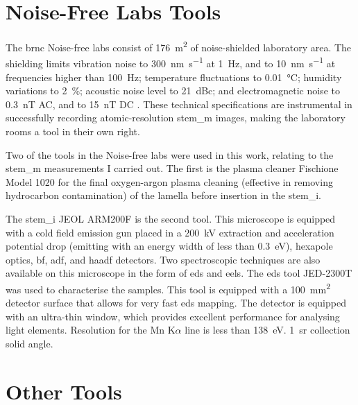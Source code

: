 \section{Noise-Free Labs Tools}

The \acs{brnc} Noise-free labs consist of \qty{176}{\m^2} of noise-shielded laboratory area. The shielding limits vibration noise to \qty{300}{\nm\per\s} at \qty{1}{Hz}, and to \qty{10}{\nm\per\s} at frequencies higher than \qty{100}{Hz}; temperature fluctuations to \qty{0.01}{\degreeCelsius}; humidity variations to \qty{2}{\%}; acoustic noise level to \qty{21}{dBc}; and electromagnetic noise to \qty{0.3}{\nano\tesla} AC, and to \qty{15}{\nano\tesla} DC \cite{Lörtscher_Noise_Free}. These technical specifications are instrumental in successfully recording atomic-resolution \acf{stem_m} images, making the laboratory rooms a tool in their own right.
\par
Two of the tools in the Noise-free labs were used in this work, relating to the \acs{stem_m} measurements I carried out. The first is the plasma cleaner Fischione Model 1020 for the final oxygen-argon plasma cleaning (effective in removing hydrocarbon contamination) of the lamella before insertion in the \acs{stem_i}. 
\par 
The \acl{stem_i} JEOL ARM200F is the second tool. This microscope is equipped with a cold field emission gun placed in a \qty{200}{\kV} extraction and acceleration potential drop (emitting with an energy width of less than \qty{0,3}{eV}), hexapole optics, \acf{bf}, \acf{adf}, and \acf{haadf} detectors. Two spectroscopic techniques are also available on this microscope in the form of \acf{eds} and \acf{eels}. The \acs{eds} tool JED-2300T was used to characterise the samples. This tool is equipped with a \qty{100}{\mm^2} detector surface that allows for very fast \acs{eds} mapping. The detector is equipped with an ultra-thin window, which provides excellent performance for analysing light elements. Resolution for the Mn K$\alpha$ line is less than \qty{138}{\eV}. \qty{1}{\steradian} collection solid angle. 

\section{Other Tools}

